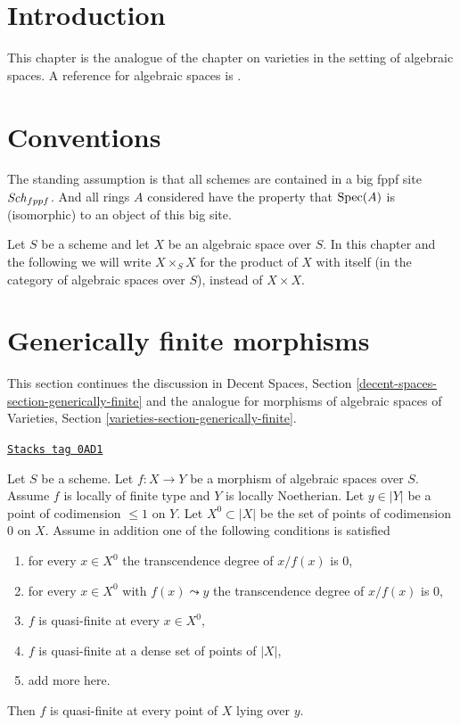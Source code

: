 \section{Introduction}
\label{spaces-over-fields-section-introduction}
This chapter is the analogue of the chapter on varieties in the setting
of algebraic spaces. A reference for algebraic spaces is
\cite{Kn}.

\section{Conventions}
\label{spaces-over-fields-section-conventions}
The standing assumption is that all schemes are contained in
a big fppf site $\mathit{Sch}_{fppf}$. And all rings $A$ considered
have the property that $\operatorname{Spec}(A)$ is (isomorphic) to an
object of this big site.

\medskip\noindent
Let $S$ be a scheme and let $X$ be an algebraic space over $S$.
In this chapter and the following we will write $X \times_S X$
for the product of $X$ with itself (in the category of algebraic
spaces over $S$), instead of $X \times X$.

\section{Generically finite morphisms}
\label{spaces-over-fields-section-generically-finite}
This section continues the discussion in
Decent Spaces, Section \ref{decent-spaces-section-generically-finite}
and the analogue for morphisms of algebraic spaces of
Varieties, Section \ref{varieties-section-generically-finite}.

\begin{lemma}
\label{spaces-over-fields-lemma-quasi-finite-in-codim-1}
\href{https://stacks.math.columbia.edu/tag/0AD1}{\texttt{Stacks tag 0AD1}}

Let $S$ be a scheme. Let $f : X \to Y$ be a morphism of algebraic spaces
over $S$. Assume $f$ is locally of finite type and $Y$ is locally Noetherian.
Let $y \in |Y|$ be a point of codimension $\leq 1$ on $Y$.
Let $X^0 \subset |X|$ be the set of points of codimension $0$ on $X$.
Assume in addition one of the following conditions is satisfied
\begin{enumerate}
\item for every $x \in X^0$ the transcendence degree of $x/f(x)$ is $0$,
\item for every $x \in X^0$ with $f(x) \leadsto y$
the transcendence degree of $x/f(x)$ is $0$,
\item $f$ is quasi-finite at every $x \in X^0$,
\item $f$ is quasi-finite at a dense set of points of $|X|$,
\item add more here.
\end{enumerate}
Then $f$ is quasi-finite at every point of $X$ lying over $y$.
\end{lemma}

